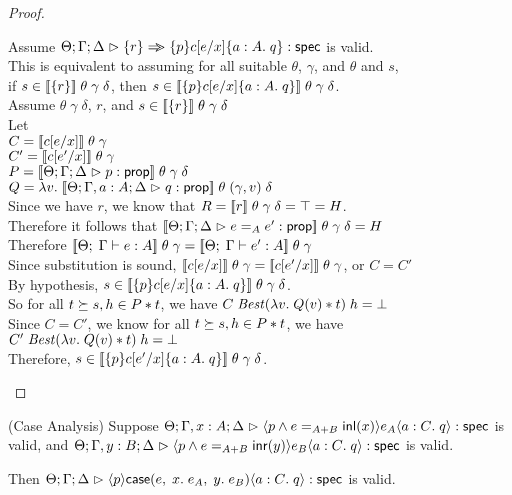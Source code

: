 \begin{proof}
\begin{tabbedproof}
\oo Assume $\judgeS{\setof{r} \specimp \spec{p}{c[e/x]}{a:A}{q}}$ is valid. \\
\ooo This is equivalent to assuming for all suitable $\theta$, $\gamma$, and $\theta$ and $s$, \\
\oooo if $s \in \interp{\setof{r}}\;\theta\;\gamma\;\delta$, then $s \in \interp{\spec{p}{c[e/x]}{a:A}{q}}\;\theta\;\gamma\;\delta$. \\
\ooo Assume $\theta\;\gamma\;\delta$, $r$, and $s \in \interp{\setof{r}}\;\theta\;\gamma\;\delta$ \\
\oooo Let \\
\oooox $C = \interp{c[e/x]}\;\theta\;\gamma$ \\
\oooox $C' = \interp{c[e'/x]}\;\theta\;\gamma$ \\
\oooox $P = \interp{\judgeA{p}{\assert}}\;\theta\;\gamma\;\delta$ \\
\oooox $Q = \semfun{v}{\interp{\judgeA[\Theta; \Gamma,a:A; \Delta]{q}{\assert}}\;\theta\;(\gamma, v)\;\delta}$ \\
\oooo Since we have $r$, we know that $R = \interp{r}\;\theta\;\gamma\;\delta = \top = H$. \\
\oooo Therefore it follows that $\interp{\judgeA{e =_A e'}{\assert}}\;\theta\;\gamma\;\delta = H$ \\
\oooo Therefore $\interp{\judgeE[\Theta]{\Gamma}{e}{A}}\;\theta\;\gamma = \interp{\judgeE[\Theta]{\Gamma}{e'}{A}}\;\theta\;\gamma$ \\
\oooo Since substitution is sound, $\interp{c[e/x]}\;\theta\;\gamma  = \interp{c[e'/x]}\;\theta\;\gamma$, or $C = C'$\\
\oooo By hypothesis, $s \in \interp{\spec{p}{c[e/x]}{a:A}{q}}\;\theta\;\gamma\;\delta$. \\
\oooo So for all $t \worldgeq s, h \in P * t$, we have $C\;\mathit{Best}(\semfun{v}{Q(v) * t})\;h = \bot$ \\
\oooo Since $C = C'$, we know for all $t \worldgeq s, h \in P * t$, we have $C'\;\mathit{Best}(\semfun{v}{Q(v) * t})\;h = \bot$ \\
\oooo Therefore, $s \in \interp{\spec{p}{c[e'/x]}{a:A}{q}}\;\theta\;\gamma\;\delta$. \\
\end{tabbedproof}
\end{proof}

\begin{lemma}{(Case Analysis)}
  Suppose $\judgeS[\Theta; \Gamma,x:A; \Delta]{\mspec{p \land e =_{A+B} \inl(x)}{e_A}{a:C}{q}}$ is valid,
      and $\judgeS[\Theta; \Gamma,y:B; \Delta]{\mspec{p \land e =_{A+B} \inr(y)}{e_B}{a:C}{q}}$ is valid.

Then $\judgeS{\mspec{p}{\Case{e}{x}{e_A}{y}{e_B}}{a:C}{q}}$ is valid. 
\end{lemma}

